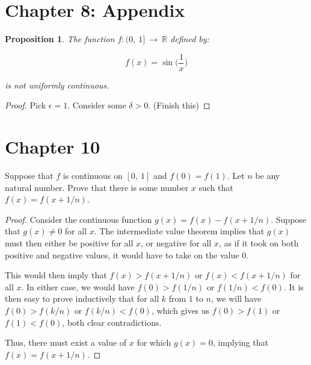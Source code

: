 \documentclass[10pt, oneside]{article}
\newenvironment{problem}[2][Problem]{\begin{trivlist}
\item[\hskip \labelsep {\bfseries #1}\hskip \labelsep {\bfseries #2.}]}{\end{trivlist}}
\newtheorem{prop}{Proposition}
\begin{document}
    \section{Chapter 8: Appendix}

    \begin{prop}
      The function $f : (0, \ 1] \ \rightarrow \ \mathbb{R}$ defined by:

        $$f(x) = \sin \Big( \frac{1}{x} \Big)$$

      is not uniformly continuous.
    \end{prop}

    \begin{proof}
      Pick $\epsilon = 1$. Consider some $\delta > 0$. (Finish this)
      \end{proof}

    \section{Chapter 10}

    \begin{problem}{10.19a}
      Suppose that $f$ is continuous on $[0, \ 1]$ and $f(0) = f(1)$. Let $n$ be any natural number. Prove that there is some number $x$
      such that $f(x) = f(x + 1/n)$.
    \end{problem}

    \begin{proof}
      Consider the continuous function $g(x) = f(x) - f(x + 1/n)$. Suppose that $g(x) \neq 0$ for all $x$. The intermediate value theorem implies that $g(x)$ must then either be
      positive for all $x$, or negative for all $x$, as if it took on both positive and negative values, it would have to take on the value $0$.
      \newline

      This would then imply that $f(x) > f(x + 1/n)$ or $f(x) < f(x + 1/n)$ for all $x$. In either case, we would have $f(0) > f(1/n)$ or $f(1/n) < f(0)$. It is then
      easy to prove inductively that for all $k$ from $1$ to $n$, we will have $f(0) > f(k/n)$ or $f(k/n) < f(0)$, which gives us $f(0) > f(1)$ or $f(1) < f(0)$, both
      clear contradictions.
      \newline

      Thus, there must exist a value of $x$ for which $g(x) = 0$, implying that $f(x) = f(x + 1/n)$.
    \end{proof}

    \begin{problem}{10.19b}
      
    \end{problem}
\end{document}
